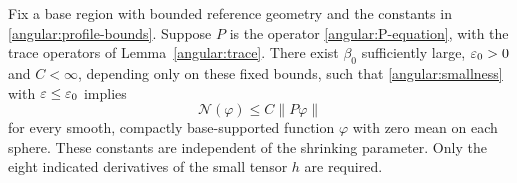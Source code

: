 \begin{proposition}
\label{angular:coercivity}
Fix a base region with bounded reference geometry and the constants in
\eqref{angular:profile-bounds}.  Suppose $P$ is the operator
\eqref{angular:P-equation}, with the trace operators of
Lemma~\ref{angular:trace}.  There exist $\beta_0$ sufficiently large,
$\varepsilon_0>0$ and $C<\infty$, depending only on these fixed bounds, such that
\eqref{angular:smallness} with $\varepsilon\le\varepsilon_0$ implies
\begin{equation}\label{angular:coercive-estimate}
 \mathcal N(\varphi)\le C\|P\varphi\|
\end{equation}
for every smooth, compactly base-supported function $\varphi$ with
zero mean on each sphere.  These constants are independent of the
shrinking parameter.  Only the eight indicated derivatives of the small
tensor $h$ are required.
\end{proposition}

